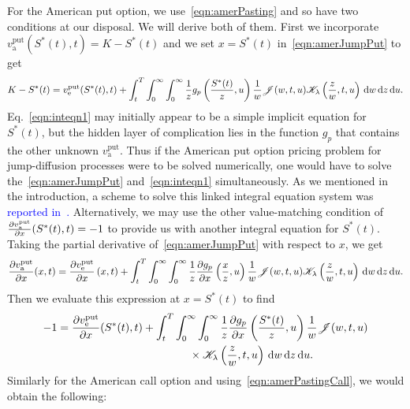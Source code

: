         	For the American put option, we use~\eqref{eqn:amerPasting} and so have two conditions at our disposal. We will derive both of them. First we incorporate $v_{\text{a}}^{\text{put}}(S^*(t),t) = K - S^*(t)$ and we set $x = S^*(t)$ in~\eqref{eqn:amerJumpPut} to get
        	\begin{equation}
        		\label{eqn:inteqn1}
        		\begin{split}
        		K - S^*(t) = v_{\text{e}}^{\text{put}}(S^*(t),t) + \int_t^T \int_0^\infty \int_0^\infty \frac{1}{z}g_p\left(\frac{S^*(t)}{z},u\right) \frac{1}{w}\mathscr J(w,t,u)\mathscr K_\lambda\left( \frac{z}{w},t,u \right) \, \mathrm d w \, \mathrm d z \, \mathrm d u.
        		\end{split}
        	\end{equation}
        	Eq.~\eqref{eqn:inteqn1} may initially appear to be a simple implicit equation for $S^*(t)$, but the hidden layer of complication lies in the function $g_p$ that contains the other unknown $v_{\text{a}}^{\text{put}}$. Thus if the American put option pricing problem for jump-diffusion processes were to be solved numerically, one would have to solve the~\eqref{eqn:amerJumpPut} and~\eqref{eqn:inteqn1} simultaneously. As we mentioned in the introduction, a scheme to solve this linked integral equation system was \textcolor{blue}{reported in~\cite{Chiarella2006}.} Alternatively, we may use the other value-matching condition of $\frac{\partial v_{\text{a}}^{\text{put}}}{\partial x}(S^*(t),t) = -1$ to provide us with another integral equation for $S^*(t)$. Taking the partial derivative of~\eqref{eqn:amerJumpPut} with respect to $x$, we get
        	$$
        		\frac{\partial v_{\text{a}}^{\text{put}}}{\partial x}( x, t) = \frac{\partial v_{\text{e}}^{\text{put}}}{\partial x}\left(x,t\right) + \int_t^T \int_0^\infty \int_0^\infty \frac{1}{z}\frac{\partial g_p}{\partial x}\left(\frac{x}{z},u\right) \frac{1}{w}\mathscr J(w,t,u)\mathscr K_\lambda\left( \frac{z}{w},t,u \right) \, \mathrm d w \, \mathrm d z \, \mathrm d u.
        	$$
Then we evaluate this expression at $x = S^*(t)$ to find
		\begin{equation}
			\label{eqn:inteqn2}
			\begin{split}
			-1 &=  \frac{\partial v_{\text{e}}^{\text{put}}}{\partial x}( S^*(t),t) + \int_t^T \int_0^\infty \int_0^\infty \frac{1}{z}\frac{\partial g_p}{\partial x}\left(\frac{ S^*(t)}{z},u\right) \frac{1}{w}\mathscr J(w,t,u) \\
			&\qquad\qquad\qquad\qquad\qquad\qquad \times \mathscr K_\lambda\left( \frac{z}{w},t,u \right) \, \mathrm d w \, \mathrm d z \, \mathrm d u.
			\end{split}
		\end{equation}
Similarly for the American call option and using~\eqref{eqn:amerPastingCall}, we would obtain the following:
